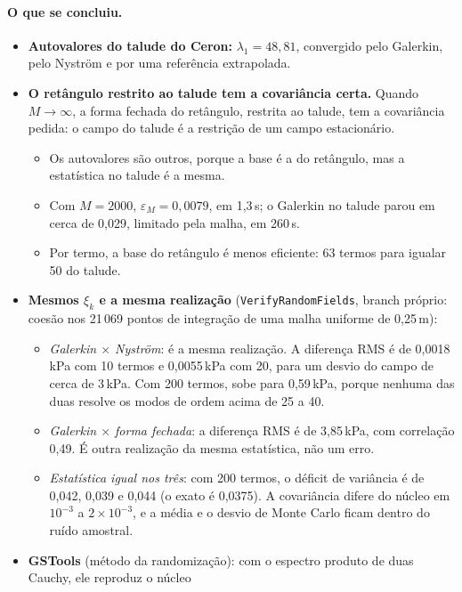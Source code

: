 \paragraph{O que se concluiu.}
\begin{itemize}
  \item \textbf{Autovalores do talude do Ceron:} $\lambda_1 = 48{,}81$, convergido pelo Galerkin, pelo Nyström e por uma
    referência extrapolada.
  \item \textbf{O retângulo restrito ao talude tem a covariância certa.} Quando $M \to \infty$, a forma fechada do
    retângulo, restrita ao talude, tem a covariância pedida: o campo do talude é a restrição de um campo estacionário.
    \begin{itemize}
      \item Os autovalores são outros, porque a base é a do retângulo, mas a estatística no talude é a mesma.
      \item Com $M = 2000$, $\varepsilon_M = 0{,}0079$, em 1,3\,s; o Galerkin no talude parou em cerca de 0,029, limitado
        pela malha, em 260\,s.
      \item Por termo, a base do retângulo é menos eficiente: 63 termos para igualar 50 do talude.
    \end{itemize}
  \item \textbf{Mesmos $\xi_k$ e a mesma realização} (\texttt{VerifyRandomFields}, branch próprio: coesão nos 21\,069
    pontos de integração de uma malha uniforme de 0,25\,m):
    \begin{itemize}
      \item \emph{Galerkin $\times$ Nyström}: é a mesma realização. A diferença RMS é de 0,0018\,kPa com 10 termos e
        0,0055\,kPa com 20, para um desvio do campo de cerca de 3\,kPa. Com 200 termos, sobe para 0,59\,kPa, porque
        nenhuma das duas resolve os modos de ordem acima de 25 a 40.
      \item \emph{Galerkin $\times$ forma fechada}: a diferença RMS é de 3,85\,kPa, com correlação 0,49. É outra
        realização da mesma estatística, não um erro.
      \item \emph{Estatística igual nos três}: com 200 termos, o déficit de variância é de 0,042, 0,039 e 0,044 (o exato
        é 0,0375). A covariância difere do núcleo em $10^{-3}$ a $2\times 10^{-3}$, e a média e o desvio de Monte Carlo
        ficam dentro do ruído amostral.
    \end{itemize}
  \item \textbf{GSTools} (método da randomização): com o espectro produto de duas Cauchy, ele reproduz o núcleo

\end{itemize}
